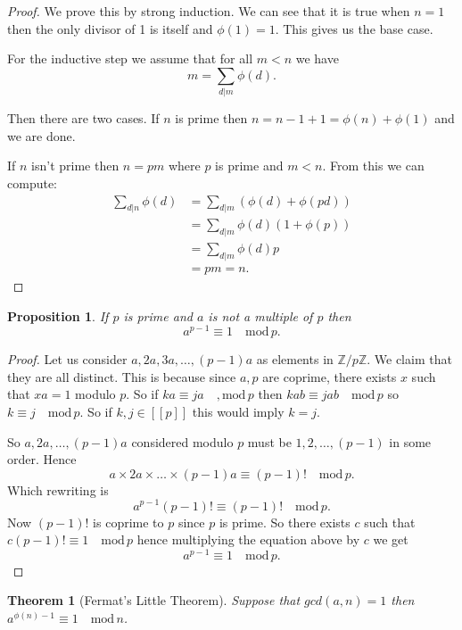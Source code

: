 \documentclass[
]{book}
\newtheorem{theorem}{Theorem}[chapter]
\newtheorem{proposition}{Proposition}[chapter]
\theoremstyle{definition}
\theoremstyle{definition}
\theoremstyle{definition}
\theoremstyle{definition}
\theoremstyle{remark}
\begin{document}
\begin{proof}
We prove this by strong induction. We can see that it is true when \(n=1\) then the only divisor of 1 is itself and \(\phi(1) =1\). This gives us the base case.

For the inductive step we assume that for all \(m < n\) we have
\[ m = \sum_{d|m} \phi(d).  \]

Then there are two cases. If \(n\) is prime then \(n = n-1 +1 = \phi(n) + \phi(1)\) and we are done.

If \(n\) isn't prime then \(n=pm\) where \(p\) is prime and \(m < n\). From this we can compute:
\begin{align*} \sum_{d|n} \phi(d) &=  \sum_{d|m} (\phi(d)+\phi(pd))  \\
& = \sum_{d|m} \phi(d)(1 + \phi(p))\\
&= \sum_{d|m} \phi(d) p\\
& = p m = n. 
\end{align*}
\end{proof}

\begin{proposition}
If \(p\) is prime and \(a\) is not a multiple of \(p\) then
\[ a^{p-1} \equiv 1 \quad \mbox{mod} \, p.  \]
\end{proposition}

\begin{proof}
Let us consider \(a, 2a, 3a, \dots, (p-1)a\) as elements in \(\mathbb{Z}/p\mathbb{Z}\). We claim that they are all distinct. This is because since \(a,p\) are coprime, there exists \(x\) such that \(xa =1\) modulo \(p\). So if \(ka \equiv ja \quad, \mbox{mod} \,p\) then \(kab \equiv jab \quad \mbox{mod} \, p\) so \(k \equiv j \quad \mbox{mod}\, p\). So if \(k, j \in [[p]]\) this would imply \(k = j\).

So \(a, 2a, \dots, (p-1)a\) considered modulo \(p\) must be \(1, 2, \dots, (p-1)\) in some order. Hence
\[ a \times 2a \times \dots \times (p-1)a \equiv (p-1)! \quad \mbox{mod}\, p. \] Which rewriting is
\[ a^{p-1} (p-1)! \equiv (p-1)! \quad \mbox{mod} \, p. \] Now \((p-1)!\) is coprime to \(p\) since \(p\) is prime. So there exists \(c\) such that \(c(p-1)! \equiv 1 \quad \mbox{mod}\, p\) hence multiplying the equation above by \(c\) we get
\[ a^{p-1} \equiv 1 \quad \mbox{mod} \, p.  \]
\end{proof}

\begin{theorem}[Fermat's Little Theorem]
Suppose that \(gcd(a,n) =1\) then \(a^{\phi(n)-1} \equiv 1 \quad \mbox{mod} \, n\).
\end{theorem}
\end{document}
